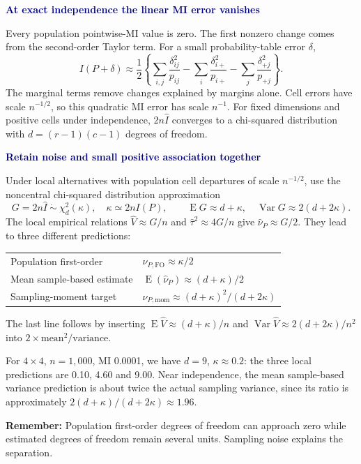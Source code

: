 \documentclass[11pt,a4paper]{article}
\newcommand{\E}{\operatorname{E}}
\newcommand{\Var}{\operatorname{Var}}
\newcommand{\Ih}{\widehat I}
\newcommand{\Vh}{\widehat V}
\newcommand{\subhead}[1]{\par\medskip\textbf{\textcolor{navy}{#1}}\par\smallskip}
\newcommand{\takeaway}[1]{\par\medskip\noindent\colorbox{pale}{\parbox{\dimexpr\linewidth-2\fboxsep\relax}{\textbf{Remember:} #1}}\par}
\newcommand{\source}[1]{\par\smallskip{\footnotesize\textcolor{navy}{Thesis reference: #1.}}}
\begin{document}
\subhead{At exact independence the linear MI error vanishes}
Every population pointwise-MI value is zero. The first nonzero change comes from the second-order Taylor term. For a small probability-table error \(\delta\),
\[
 I(P+\delta)\approx\frac12\left\{
  \sum_{i,j}\frac{\delta_{ij}^2}{p_{ij}}
 -\sum_i\frac{\delta_{i+}^2}{p_{i+}}
 -\sum_j\frac{\delta_{+j}^2}{p_{+j}}\right\}.
\]
The marginal terms remove changes explained by margins alone. Cell errors have scale \(n^{-1/2}\), so this quadratic MI error has scale \(n^{-1}\). For fixed dimensions and positive cells under independence, \(2n\Ih\) converges to a chi-squared distribution with \(d=(r-1)(c-1)\) degrees of freedom.

\subhead{Retain noise and small positive association together}
Under local alternatives with population cell departures of scale \(n^{-1/2}\), use the noncentral chi-squared distribution approximation
\[
 G=2n\Ih\ \dot\sim\ \chi^2_d(\kappa),\quad \kappa\simeq2nI(P),\qquad
 \E G\approx d+\kappa,\quad\Var G\approx2(d+2\kappa).
\]
The local empirical relations \(\Vh\approx G/n\) and \(\widehat\tau^2\approx4G/n\) give \(\widehat\nu_P\approx G/2\). They lead to three different predictions:
\begin{center}
\begin{tabular}{@{}ll@{}}\toprule
Population first-order & \(\nu_{P,\mathrm{FO}}\approx\kappa/2\)\\[3pt]
Mean sample-based estimate & \(\E(\widehat\nu_P)\approx(d+\kappa)/2\)\\[3pt]
Sampling-moment target & \(\nu_{P,\mathrm{mom}}\approx(d+\kappa)^2/(d+2\kappa)\)\\\bottomrule
\end{tabular}
\end{center}
The last line follows by inserting \(\E\Vh\approx(d+\kappa)/n\) and \(\Var\Vh\approx2(d+2\kappa)/n^2\) into \(2\times\text{mean}^2/\text{variance}\).

For \(4\times4\), \(n=1{,}000\), MI 0.0001, we have \(d=9\), \(\kappa\approx0.2\): the three local predictions are 0.10, 4.60 and 9.00. Near independence, the mean sample-based variance prediction is about twice the actual sampling variance, since its ratio is approximately \(2(d+\kappa)/(d+2\kappa)\approx1.96\).

\takeaway{Population first-order degrees of freedom can approach zero while estimated degrees of freedom remain several units. Sampling noise explains the separation.}
\source{Section 4.5 and Appendix A. These are local approximations, not identities for arbitrary association}
\end{document}
